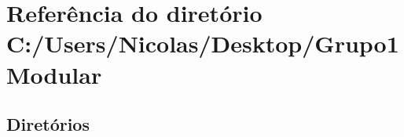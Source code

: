 \section{Referência do diretório C\+:/\+Users/\+Nicolas/\+Desktop/\+Grupo1\+Modular}
\label{dir_214eb2c3f1211b3fb7d72398bbf390d3}
\subsection*{Diretórios}
\begin{DoxyCompactItemize}
\end{DoxyCompactItemize}
